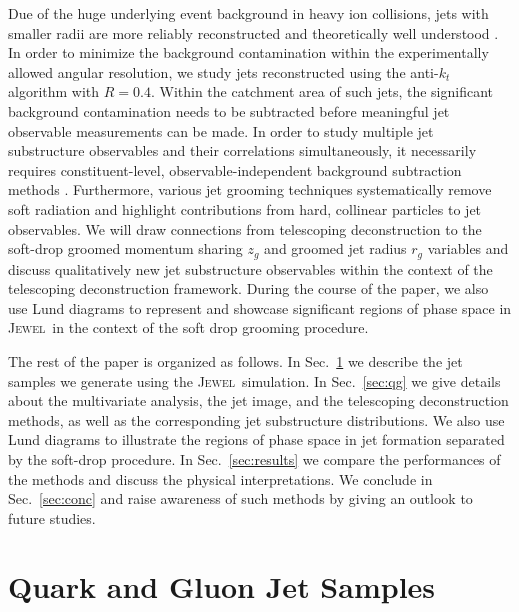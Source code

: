 \documentclass[notoc,preprintnumbers]{JHEP3}
\newcommand{\jw}{\textsc{Jewel}~}
\begin{document}
Due of the huge underlying event background in heavy ion collisions, jets with smaller radii are more reliably reconstructed and theoretically well understood \cite{Dasgupta:2014yra,Chien:2015cka,Becher:2015hka,Kang:2016mcy}. In order to minimize the background contamination within the experimentally allowed angular resolution, we study jets reconstructed using the anti-$k_t$ algorithm \cite{Cacciari:2008gp} with $R=0.4$. Within the catchment area of such jets, the significant background contamination needs to be subtracted before meaningful jet observable measurements can be made. In order to study multiple jet substructure observables and their correlations simultaneously, it necessarily requires constituent-level, observable-independent background subtraction methods \cite{Soyez:2012hv,Cacciari:2014gra,Berta:2014eza,Bertolini:2014bba,Komiske:2017ubm}. Furthermore, various jet grooming techniques \cite{Ellis:2009su,Ellis:2009me,Krohn:2009th,Dasgupta:2013ihk,Larkoski:2014wba} systematically remove soft radiation and highlight contributions from hard, collinear particles to jet observables. We will draw connections from telescoping deconstruction to the soft-drop groomed momentum sharing $z_g$ and groomed jet radius $r_g$ variables \cite{Larkoski:2014wba} and discuss qualitatively new jet substructure observables within the context of the telescoping deconstruction framework. During the course of the paper, we also use Lund diagrams \cite{Andersson1989,Salam:2016yht} to represent and showcase significant regions of phase space in \jw in the context of the soft drop grooming procedure.

The rest of the paper is organized as follows. In Sec.~\ref{sec:sample} we describe the jet samples we generate using the \jw simulation. In Sec.~\ref{sec:qg} we give details about the multivariate analysis, the jet image, and the telescoping deconstruction methods, as well as the corresponding jet substructure distributions. We also use Lund diagrams to illustrate the regions of phase space in jet formation separated by the soft-drop procedure. In Sec.~\ref{sec:results} we compare the performances of the methods and discuss the physical interpretations. We conclude in Sec.~\ref{sec:conc} and raise awareness of such methods by giving an outlook to future studies.


\section{Quark and Gluon Jet Samples}
\label{sec:sample}
\end{document}
